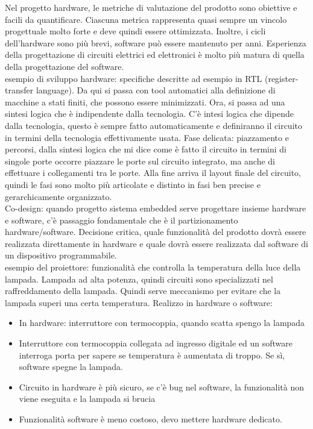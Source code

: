 \documentclass[12pt, oneside]{extbook}
\begin{document}
Nel progetto hardware, le metriche di valutazione del prodotto sono obiettive e facili da quantificare. Ciascuna metrica rappresenta quasi sempre un vincolo progettuale molto forte e deve quindi essere ottimizzata. Inoltre, i cicli dell'hardware sono più brevi, software può essere mantenuto per anni. Esperienza della progettazione di circuiti elettrici ed elettronici è molto più matura di quella della progettazione del software.\\ esempio di sviluppo hardware: specifiche descritte ad esempio in RTL (register-transfer language). Da qui si passa con tool automatici alla definizione di macchine a stati finiti, che possono essere minimizzati. Ora, si passa ad una sintesi logica che è indipendente dalla tecnologia. C'è intesi logica che dipende dalla tecnologia, questo è sempre fatto automaticamente e definiranno il circuito in termini della tecnologia effettivamente usata. Fase delicata: piazzamento e percorsi, dalla sintesi logica che mi dice come è fatto il circuito in termini di singole porte occorre piazzare le porte sul circuito integrato, ma anche di effettuare i collegamenti tra le porte. Alla fine arriva il layout finale del circuito, quindi le fasi sono molto più articolate e distinto in fasi ben precise e gerarchicamente organizzato.\\ Co-design: quando progetto sistema embedded serve progettare insieme hardware e software, c'è passaggio fondamentale che è il partizionamento hardware/software. Decisione critica, quale funzionalità del prodotto dovrà essere realizzata direttamente in hardware e quale dovrà essere realizzata dal software di un dispositivo programmabile.\\ esempio del proiettore: funzionalità che controlla la temperatura della luce della lampada. Lampada ad alta potenza, quindi circuiti sono specializzati nel raffreddamento della lampada. Quindi serve meccanismo per evitare che la lampada superi una certa temperatura. Realizzo in hardware o software: 
\begin{itemize}
\item In hardware: interruttore con termocoppia, quando scatta spengo la lampada
\item Interruttore con termocoppia collegata ad ingresso digitale ed un software interroga porta per sapere se temperatura è aumentata di troppo. Se sì, software spegne la lampada.
\item Circuito in hardware è più sicuro, se c'è bug nel software, la funzionalità non viene eseguita e la lampada si brucia
\item Funzionalità software è meno costoso, devo mettere hardware dedicato.
\end{itemize}
\end{document}
